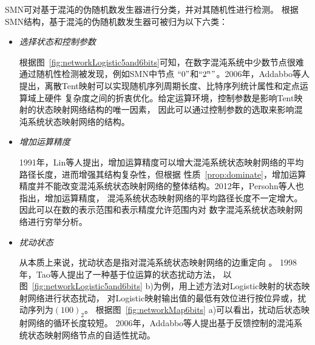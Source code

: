 SMN可对基于混沌的伪随机数发生器进行分类，并对其随机性进行检测。
根据SMN结构，基于混沌的伪随机数发生器可被归为以下六类：
\begin{itemize}
\item \textit{选择状态和控制参数}

根据图~\ref{fig:networkLogistic5and6bits}可知，在数字混沌系统中少数节点很难通过随机性检测被发现，例如SMN中节点
$``0"$和$``2^n"$。2006年，Addabbo等人提出，离散Tent映射可以实现随机序列周期长度、比特序列统计属性和定点运算域上硬件
复杂度之间的折衷优化。给定运算环境，控制参数是影响Tent映射的状态映射网络结构的唯一因素，
因此可以通过控制参数的选取来影响混沌系统状态映射网络的结构。

\item \textit{增加运算精度}

1991年，Lin等人提出，增加运算精度可以增大混沌系统状态映射网络的平均路径长度，进而增强其结构复杂性，但根据
性质~\ref{prop:dominate}，增加运算精度并不能改变混沌系统状态映射网络的整体结构。2012年，Persohn等人也指出，增加运算精度，
混沌系统状态映射网络的平均路径长度不一定增大。因此可以在数的表示范围和表示精度允许范围内对
数字混沌系统状态映射网络进行穷举分析。

\item \textit{扰动状态}

从本质上来说，扰动状态是指对混沌系统状态映射网络的边重定向
。
1998年，Tao等人提出了一种基于位运算的状态扰动方法，
以图~\ref{fig:networkLogistic5and6bits} b)为例，用上述方法对Logistic映射的状态映射网络进行状态扰动，
对Logistic映射输出值的最低有效位进行按位异或，扰动序列为$(100)_{2}$。
根据图~\ref{fig:networkMap6bits} a)可以看出，扰动后状态映射网络的循环长度较短。
2006年，Addabbo等人提出基于反馈控制的混沌系统状态映射网络节点的自适性扰动。


\end{itemize}
